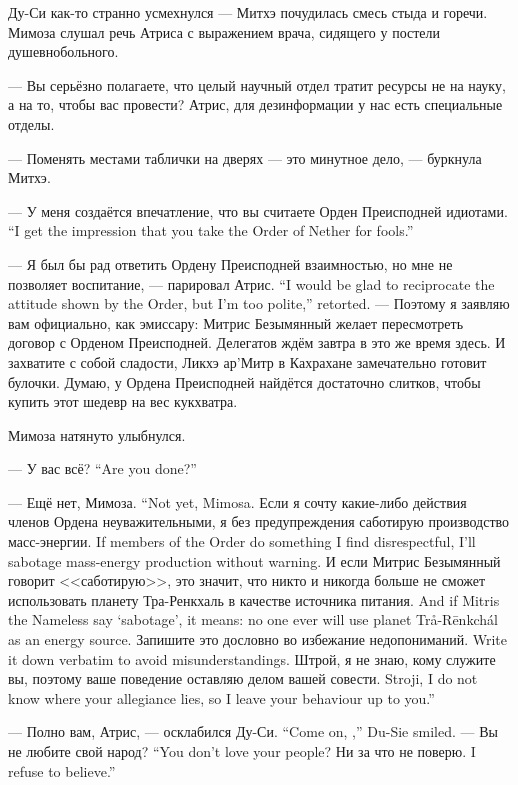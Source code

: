 Ду-Си как-то странно усмехнулся --- Митхэ почудилась смесь стыда и горечи.
Мимоза слушал речь Атриса с выражением врача, сидящего у постели душевнобольного.

--- Вы серьёзно полагаете, что целый научный отдел тратит ресурсы не на науку, а на то, чтобы вас провести?
Атрис, для дезинформации у нас есть специальные отделы.

--- Поменять местами таблички на дверях --- это минутное дело, --- буркнула Митхэ.

{--- У меня создаётся впечатление, что вы считаете Орден Преисподней идиотами.}
{``I get the impression that you take the Order of Nether for fools.''}

{--- Я был бы рад ответить Ордену Преисподней взаимностью, но мне не позволяет воспитание, --- парировал Атрис.}
{``I would be glad to reciprocate the attitude shown by the Order, but I'm too polite,'' \Aatris{} retorted.}
--- Поэтому я заявляю вам официально, как эмиссару: Митрис Безымянный желает пересмотреть договор с Орденом Преисподней.
Делегатов ждём завтра в это же время здесь.
И захватите с собой сладости, Ликхэ ар'Митр в Кахрахане замечательно готовит булочки.
Думаю, у Ордена Преисподней найдётся достаточно слитков, чтобы купить этот шедевр на вес кукхватра.

Мимоза натянуто улыбнулся.

{--- У вас всё?}
{``Are you done?''}

{--- Ещё нет, Мимоза.}
{``Not yet, Mimosa.}
{Если я сочту какие-либо действия членов Ордена неуважительными, я без предупреждения саботирую производство масс-энергии.}
{If members of the Order do something I find disrespectful, I'll sabotage mass-energy production without warning.}
{И если Митрис Безымянный говорит <<саботирую>>, это значит, что никто и никогда больше не сможет использовать планету Тра-Ренкхаль в качестве источника питания.}
{And if Mitris the Nameless say `sabotage', it means: no one ever will use planet Tr\r{a}-R\={e}nkch\'{a}l as an energy source.}
{Запишите это дословно во избежание недопониманий.}
{Write it down verbatim to avoid misunderstandings.}
{Штрой, я не знаю, кому служите вы, поэтому ваше поведение оставляю делом вашей совести.}
{Stroji, I do not know where your allegiance lies, so I leave your behaviour up to you.''}

{--- Полно вам, Атрис, --- осклабился Ду-Си.}
{``Come on, \Aatris{},'' Du-Sie smiled.}
{--- Вы не любите свой народ?}
{``You don't love your people?}
{Ни за что не поверю.}
{I refuse to believe.''}

